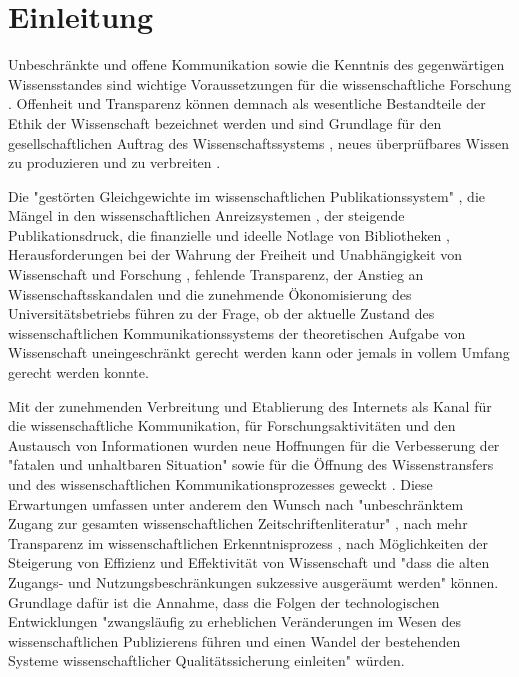 \chapter{Einleitung}

Unbeschränkte und offene Kommunikation sowie die Kenntnis des gegenwärtigen Wissensstandes sind wichtige Voraussetzungen für die wissenschaftliche Forschung \cite{Glaeser_2006} \cite{Gibbons_1994}. Offenheit und Transparenz können demnach als wesentliche Bestandteile der Ethik der Wissenschaft bezeichnet werden \cite{Peters_2014} \cite{Resnik_2005} und sind Grundlage für den gesellschaftlichen Auftrag des Wissenschaftssystems \cite[:3]{Hanekop_2014}, neues überprüfbares Wissen zu produzieren und zu verbreiten \cite[:551]{Luescher_2014} \cite[:298]{Luhmann_1998} \cite[:100]{Graefen_2007}.

Die "gestörten Gleichgewichte im wissenschaftlichen Publikationssystem" \cite{Jospeph_2006}, die Mängel in den wissenschaftlichen Anreizsystemen \cite{Osterloh_2008}, der steigende Publikationsdruck, die finanzielle und ideelle Notlage von Bibliotheken \cite{Russell_2008} \cite{Sietmann_2007}, Herausforderungen bei der Wahrung der Freiheit und Unabhängigkeit von Wissenschaft und Forschung \cite{Goetting_2015}, fehlende Transparenz, der Anstieg an Wissenschaftsskandalen \cite{Brembs_2015} und die zunehmende Ökonomisierung des Universitätsbetriebs \cite{Bauer_2006} führen zu der Frage, ob der aktuelle Zustand des wissenschaftlichen Kommunikationssystems der theoretischen Aufgabe von Wissenschaft uneingeschränkt gerecht werden kann \cite{Schekman_2013} oder jemals in vollem Umfang gerecht werden konnte.

Mit der zunehmenden Verbreitung und Etablierung des Internets als Kanal für die wissenschaftliche Kommunikation, für Forschungsaktivitäten und den Austausch von Informationen wurden neue Hoffnungen für die Verbesserung der "fatalen und unhaltbaren Situation" \cite[:155]{Brembs_2015} sowie für die Öffnung des Wissenstransfers \cite{Schulze_2013} \cite{Albert_2006} und des wissenschaftlichen Kommunikationsprozesses geweckt \cite{Hanekop_2014} \cite{European_Commission_2006} \cite{Goodrum_2001} \cite{Lawrence_1999}. Diese Erwartungen umfassen unter anderem den Wunsch nach "unbeschränktem Zugang zur gesamten wissenschaftlichen Zeitschriftenliteratur" \cite{BOAI_2002}, nach mehr Transparenz im wissenschaftlichen Erkenntnisprozess \cite{European_Commission_2015a}, nach Möglichkeiten der Steigerung von Effizienz und Effektivität von Wissenschaft \cite{Partha_1994} und "dass die alten Zugangs- und Nutzungsbeschränkungen sukzessive ausgeräumt werden" \cite{BOAI_2002} können. Grundlage dafür ist die Annahme, dass die Folgen der technologischen Entwicklungen "zwangsläufig zu erheblichen Veränderungen im Wesen des wissenschaftlichen Publizierens führen und einen Wandel der bestehenden Systeme wissenschaftlicher Qualitätssicherung einleiten" \cite{Berliner_Erklaerung_2003} würden.

